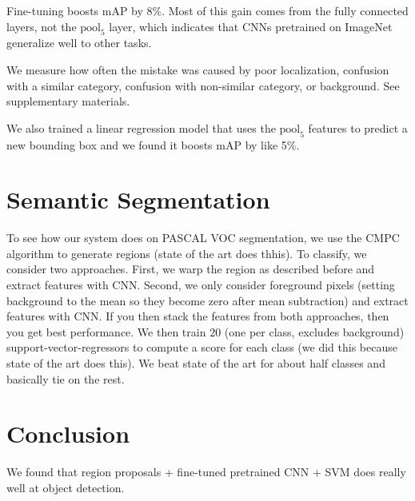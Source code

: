 \documentclass[a4paper]{article}
\begin{document}
Fine-tuning boosts mAP by 8\%. Most of this gain comes from the fully connected
layers, not the $\textrm{pool}_5$ layer, which indicates that CNNs pretrained on ImageNet
generalize well to other tasks.

We measure how often the mistake was caused by poor localization,
confusion with a similar category, confusion with non-similar category, or
background. See supplementary materials.

We also trained a linear regression model that uses the $\textrm{pool}_5$ features to
predict a new bounding box and we found it boosts mAP by like 5\%.

\section{Semantic Segmentation}
To see how our system does on PASCAL VOC segmentation, we use the CMPC
algorithm to generate regions (state of the art does thhis). To classify,
we consider two approaches. First,
we warp the region as described before and extract features with CNN.
Second, we only consider foreground pixels (setting background to the mean so
they become zero after mean subtraction) and extract features with CNN. If you
then stack the features from both approaches, then you get best performance.
We then train 20 (one per class, excludes background) support-vector-regressors
to compute a score for each class (we did this because state of the art does
this). We beat state of the art for about half classes and basically tie on
the rest.

\section{Conclusion}
We found that region proposals + fine-tuned pretrained CNN + SVM does really
well at object detection.
\end{document}
